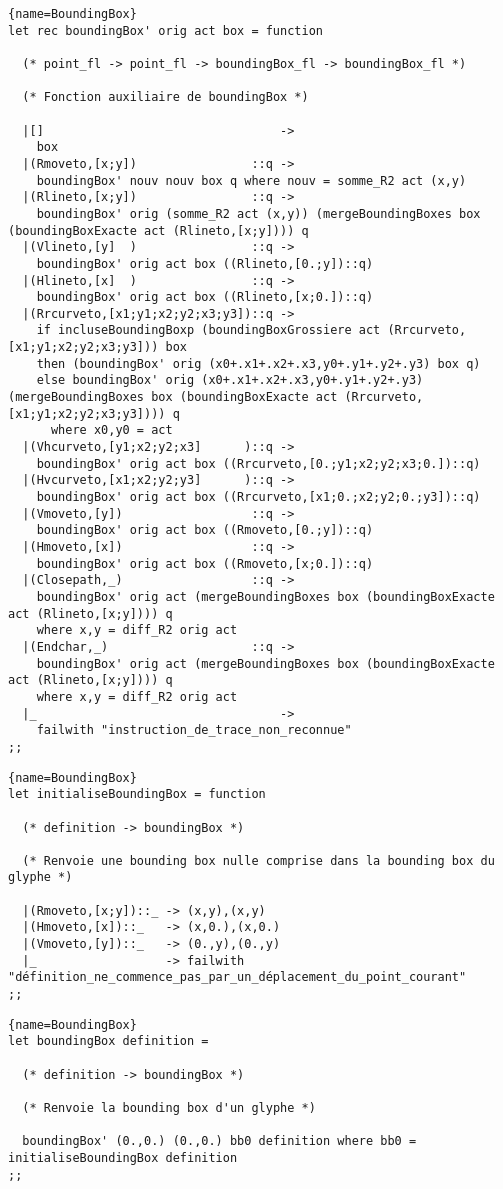 \documentclass[10pt,twoside,a4paper]{article}
\begin{document}
\pagebreak
\begin{lstlisting}{name=BoundingBox}
let rec boundingBox' orig act box = function

  (* point_fl -> point_fl -> boundingBox_fl -> boundingBox_fl *)

  (* Fonction auxiliaire de boundingBox *)

  |[]                                 ->
    box
  |(Rmoveto,[x;y])                ::q ->
    boundingBox' nouv nouv box q where nouv = somme_R2 act (x,y)
  |(Rlineto,[x;y])                ::q ->
    boundingBox' orig (somme_R2 act (x,y)) (mergeBoundingBoxes box (boundingBoxExacte act (Rlineto,[x;y]))) q
  |(Vlineto,[y]  )                ::q ->
    boundingBox' orig act box ((Rlineto,[0.;y])::q)
  |(Hlineto,[x]  )                ::q ->
    boundingBox' orig act box ((Rlineto,[x;0.])::q)
  |(Rrcurveto,[x1;y1;x2;y2;x3;y3])::q ->
    if incluseBoundingBoxp (boundingBoxGrossiere act (Rrcurveto,[x1;y1;x2;y2;x3;y3])) box
    then (boundingBox' orig (x0+.x1+.x2+.x3,y0+.y1+.y2+.y3) box q)
    else boundingBox' orig (x0+.x1+.x2+.x3,y0+.y1+.y2+.y3) (mergeBoundingBoxes box (boundingBoxExacte act (Rrcurveto,[x1;y1;x2;y2;x3;y3]))) q
      where x0,y0 = act
  |(Vhcurveto,[y1;x2;y2;x3]      )::q ->
    boundingBox' orig act box ((Rrcurveto,[0.;y1;x2;y2;x3;0.])::q)
  |(Hvcurveto,[x1;x2;y2;y3]      )::q ->
    boundingBox' orig act box ((Rrcurveto,[x1;0.;x2;y2;0.;y3])::q)
  |(Vmoveto,[y])                  ::q ->
    boundingBox' orig act box ((Rmoveto,[0.;y])::q)
  |(Hmoveto,[x])                  ::q ->
    boundingBox' orig act box ((Rmoveto,[x;0.])::q)
  |(Closepath,_)                  ::q ->
    boundingBox' orig act (mergeBoundingBoxes box (boundingBoxExacte act (Rlineto,[x;y]))) q
    where x,y = diff_R2 orig act
  |(Endchar,_)                    ::q ->
    boundingBox' orig act (mergeBoundingBoxes box (boundingBoxExacte act (Rlineto,[x;y]))) q
    where x,y = diff_R2 orig act
  |_                                  ->
    failwith "instruction_de_trace_non_reconnue" 
;;
\end{lstlisting}

\begin{lstlisting}{name=BoundingBox}
let initialiseBoundingBox = function

  (* definition -> boundingBox *)

  (* Renvoie une bounding box nulle comprise dans la bounding box du glyphe *)

  |(Rmoveto,[x;y])::_ -> (x,y),(x,y)
  |(Hmoveto,[x])::_   -> (x,0.),(x,0.)
  |(Vmoveto,[y])::_   -> (0.,y),(0.,y)
  |_                  -> failwith "définition_ne_commence_pas_par_un_déplacement_du_point_courant"
;;
\end{lstlisting}
\pagebreak
\begin{lstlisting}{name=BoundingBox}
let boundingBox definition =

  (* definition -> boundingBox *)

  (* Renvoie la bounding box d'un glyphe *)
  
  boundingBox' (0.,0.) (0.,0.) bb0 definition where bb0 = initialiseBoundingBox definition
;; 
\end{lstlisting}
\end{document}
